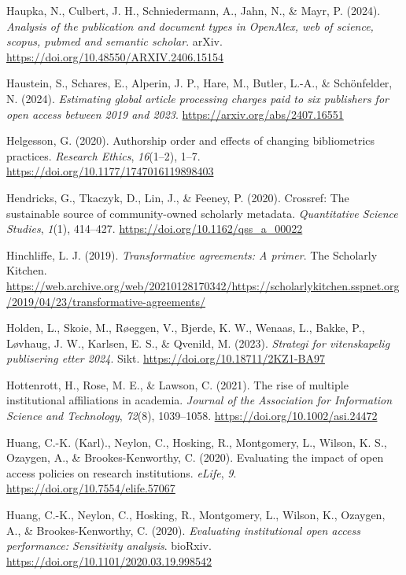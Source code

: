 \documentclass[a4paper,man,floatsintext,longtable,noextraspace,10pt]{apa6}
\newlength{\cslhangindent}
\newenvironment{CSLReferences}[2] %
{\begin{list}{}{%
  \setlength{\itemindent}{0pt}
  \setlength{\leftmargin}{0pt}
  \setlength{\parsep}{0pt}
  \ifodd #1
  \setlength{\leftmargin}{\cslhangindent}
  \setlength{\itemindent}{-1\cslhangindent}
  \fi
  \setlength{\itemsep}{#2\baselineskip}}}
{\end{list}}
\begin{document}
\begin{CSLReferences}{1}{0}
Haupka, N., Culbert, J. H., Schniedermann, A., Jahn, N., \& Mayr, P.
(2024). \emph{Analysis of the publication and document types in
OpenAlex, web of science, scopus, pubmed and semantic scholar}. arXiv.
\url{https://doi.org/10.48550/ARXIV.2406.15154}

Haustein, S., Schares, E., Alperin, J. P., Hare, M., Butler, L.-A., \&
Schönfelder, N. (2024). \emph{Estimating global article processing
charges paid to six publishers for open access between 2019 and 2023}.
\url{https://arxiv.org/abs/2407.16551}

Helgesson, G. (2020). Authorship order and effects of changing
bibliometrics practices. \emph{Research Ethics}, \emph{16}(1--2), 1--7.
\url{https://doi.org/10.1177/1747016119898403}

Hendricks, G., Tkaczyk, D., Lin, J., \& Feeney, P. (2020). Crossref: The
sustainable source of community-owned scholarly metadata.
\emph{Quantitative Science Studies}, \emph{1}(1), 414--427.
\url{https://doi.org/10.1162/qss_a_00022}

Hinchliffe, L. J. (2019). \emph{Transformative agreements: A primer}.
The Scholarly Kitchen.
\url{https://web.archive.org/web/20210128170342/https://scholarlykitchen.sspnet.org/2019/04/23/transformative-agreements/}

Holden, L., Skoie, M., Røeggen, V., Bjerde, K. W., Wenaas, L., Bakke,
P., Løvhaug, J. W., Karlsen, E. S., \& Qvenild, M. (2023).
\emph{Strategi for vitenskapelig publisering etter 2024}. Sikt.
\url{https://doi.org/10.18711/2KZ1-BA97}

Hottenrott, H., Rose, M. E., \& Lawson, C. (2021). The rise of multiple
institutional affiliations in academia. \emph{Journal of the Association
for Information Science and Technology}, \emph{72}(8), 1039--1058.
\url{https://doi.org/10.1002/asi.24472}

Huang, C.-K. (Karl)., Neylon, C., Hosking, R., Montgomery, L., Wilson,
K. S., Ozaygen, A., \& Brookes-Kenworthy, C. (2020). Evaluating the
impact of open access policies on research institutions. \emph{eLife},
\emph{9}. \url{https://doi.org/10.7554/elife.57067}

Huang, C.-K., Neylon, C., Hosking, R., Montgomery, L., Wilson, K.,
Ozaygen, A., \& Brookes-Kenworthy, C. (2020). \emph{Evaluating
institutional open access performance: Sensitivity analysis}. bioRxiv.
\url{https://doi.org/10.1101/2020.03.19.998542}


\end{CSLReferences}
\end{document}
